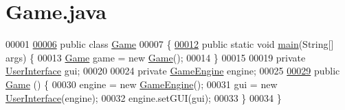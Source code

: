 \hypertarget{Game_8java_source}{\section{Game.\-java}
}

\begin{DoxyCode}
00001 
\hypertarget{Game_8java_source_l00006}{}\hyperlink{classGame}{00006} \textcolor{keyword}{public} \textcolor{keyword}{class }\hyperlink{classGame}{Game}
00007 \{
\hypertarget{Game_8java_source_l00012}{}\hyperlink{classGame_ae52595a27ac1b327b05db2129ad81fca}{00012}     \textcolor{keyword}{public} \textcolor{keyword}{static} \textcolor{keywordtype}{void} \hyperlink{classGame_ae52595a27ac1b327b05db2129ad81fca}{main}(String[] args) \{
00013         \hyperlink{classGame}{Game} game = \textcolor{keyword}{new} \hyperlink{classGame_a2e034e53e9c032964ecd2a831b29a616}{Game}();
00014     \}
00015 
00019     \textcolor{keyword}{private} \hyperlink{classUserInterface}{UserInterface} gui;
00020 
00024     \textcolor{keyword}{private} \hyperlink{classGameEngine}{GameEngine} engine;
00025 
\hypertarget{Game_8java_source_l00029}{}\hyperlink{classGame_a2e034e53e9c032964ecd2a831b29a616}{00029}     \textcolor{keyword}{public} \hyperlink{classGame_a2e034e53e9c032964ecd2a831b29a616}{Game} () \{
00030         engine = \textcolor{keyword}{new} \hyperlink{classGameEngine}{GameEngine}();
00031         gui = \textcolor{keyword}{new} \hyperlink{classUserInterface}{UserInterface}(engine);
00032         engine.setGUI(gui);
00033     \}
00034 \}
\end{DoxyCode}
